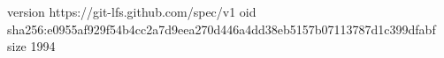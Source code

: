 version https://git-lfs.github.com/spec/v1
oid sha256:e0955af929f54b4cc2a7d9eea270d446a4dd38eb5157b07113787d1c399dfabf
size 1994
